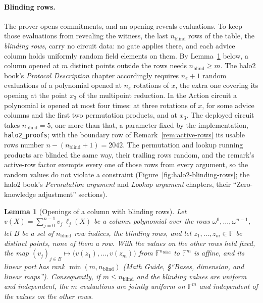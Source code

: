 \documentclass[11pt,a4paper]{article}
\newtheorem{lemma}[theorem]{Lemma}
\theoremstyle{definition}
\newcommand{\F}{\mathbb{F}}
\begin{document}
\paragraph{Blinding rows.}
The prover opens commitments, and an opening reveals evaluations. To
keep those evaluations from revealing the witness, the last
$n_{\mathrm{blind}}$ rows of
the table, the \emph{blinding rows}, carry no circuit data: no gate
applies there, and each advice column holds uniformly random field
elements on them. By Lemma~\ref{lem:halo2-blinding-rows} below, a column
opened at $m$ distinct points outside the rows needs
$n_{\mathrm{blind}} \ge m$. The
halo2 book's \emph{Protocol Description} chapter accordingly requires
$n_e + 1$ random evaluations of a polynomial opened at $n_e$ rotations of
$x$, the extra one covering its opening at the point $x_3$ of the
multipoint reduction. In the Action circuit a polynomial is opened at
most four times: at three rotations of $x$, for some advice columns and
the first two permutation products, and at $x_3$. The deployed circuit
takes $n_{\mathrm{blind}} = 5$, one more than that, a parameter fixed by
the implementation, \texttt{halo2\_proofs}; with the boundary row of
Remark~\ref{rem:active-rows} its usable rows number
$n - (n_{\mathrm{blind}} + 1) = 2042$. The permutation and lookup running
products are blinded the same way, their trailing rows random, and the remark's
active-row factor exempts every one of those rows from every argument,
so the random values do not violate a constraint
(Figure~\ref{fig:halo2-blinding-rows}; the halo2 book's
\emph{Permutation argument} and \emph{Lookup argument} chapters, their
``Zero-knowledge adjustment'' sections).

\begin{lemma}[Openings of a column with blinding rows]
\label{lem:halo2-blinding-rows}
Let $v(X) = \sum_{j=0}^{n-1} v_j\,\ell_j(X)$ be a column polynomial over
the rows $\omega^{0}, \dots, \omega^{n-1}$, let $B$ be a set of
$n_{\mathrm{blind}}$ row indices, the blinding rows, and let
$z_1, \dots, z_m \in \F$ be distinct points, none of them a row. With
the values on the other rows held fixed, the map
$(v_j)_{j \in B} \mapsto \bigl(v(z_1), \dots, v(z_m)\bigr)$ from
$\F^{n_{\mathrm{blind}}}$ to $\F^{m}$ is affine, and its linear part has
rank $\min(m, n_{\mathrm{blind}})$ (\emph{Math Guide}, \S``Bases,
dimension, and linear maps''). Consequently, if $m \le n_{\mathrm{blind}}$
and the blinding values are uniform and independent, the $m$ evaluations
are jointly uniform on $\F^{m}$ and independent of the values on the
other rows.
\end{lemma}
\end{document}
